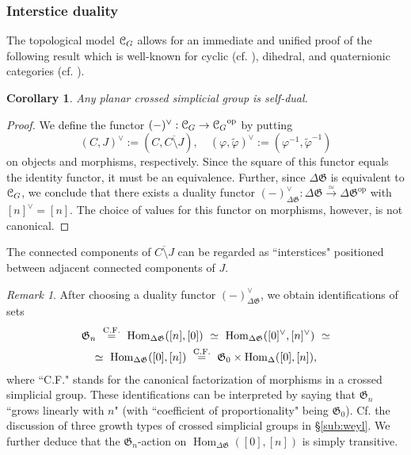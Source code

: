 \documentclass[english,11pt,leqno]{article}
\def\Gen{\mathfrak{G}}
\def\Hom{\operatorname{Hom}}
\def\on{\operatorname}
\def\op{{\operatorname{op}}}
\def\Hom{\operatorname{Hom}}
\def\DG{ {\Delta \Gen}}
\def\CG{{ {\EuScript C}_G}}
\newtheorem{cor}[thm]{Corollary}
\theoremstyle{definition}
\theoremstyle{remark}
\newtheorem{rem}[thm]{Remark}
\numberwithin{equation}{section}
\begin{document}
 

 
\subsubsection {Interstice duality}
 
The topological model $\CG$ allows for an immediate and unified proof of the following result which is
well-known for cyclic (cf. \cite{connes, drinfeld:cyclic}), dihedral, and quaternionic categories (cf. \cite{dunn}).

\begin{cor}\label{cor:duality}
Any planar crossed simplicial group is self-dual.
\end{cor}
\begin{proof}  We define the  functor $(-)^{\vee}: \CG \to
	\CG^{\op}$  by putting
		\[
		(C,J)^{\vee} := (C, \overline{C \setminus J}), \quad 
 (\varphi, \widetilde{\varphi})^{\vee} := (\varphi^{-1}, \widetilde{\varphi}^{-1})
	\]
	on objects and morphisms, respectively. 
	Since the square of this functor equals the identity functor, it must be an equivalence.
	Further, since $\DG$ is equivalent to $\CG$, we conclude that there exists a duality functor $(-)^\vee_\DG:
	\DG \overset{\simeq}{\to} \DG^\op$ with $[n]^\vee=[n]$. The choice of values for this functor on morphisms, however, is
	not canonical. 
\end{proof}

The connected components of $\overline{C \setminus J}$ can be regarded as ``interstices" positioned
between adjacent connected components of $J$. 

\begin{rem}\label{rems:duality}
After choosing a duality functor $(-)^\vee_\DG$, we obtain identifications of sets
\[
\begin{gathered}
\Gen_n \,\, \buildrel \on{C.F.} \over = \,\, \Hom_\DG([n], [0]) \,\,\simeq \,\, \Hom_\DG([0]^\vee, [n]^\vee)\,\,\simeq \\
\simeq \,\, \Hom_\DG([0], [n]) \,\, \buildrel \on{C.F.} \over = \,\, \Gen_0 \times \Hom_\Delta([0], [n]),
\end{gathered}
\]
where ``C.F." stands for the canonical factorization of morphisms in a crossed simplicial group.
These identifications can be interpreted by saying that $\Gen_n$
``grows linearly with $n$" (with ``coefficient of proportionality" being $\Gen_0$). Cf. the discussion
of three growth types of crossed simplicial groups in \S \ref{sub:weyl}.
We further deduce that the $\Gen_n$-action on $\Hom_\DG([0], [n])$ is simply transitive. 
\end{rem}
\end{document}
